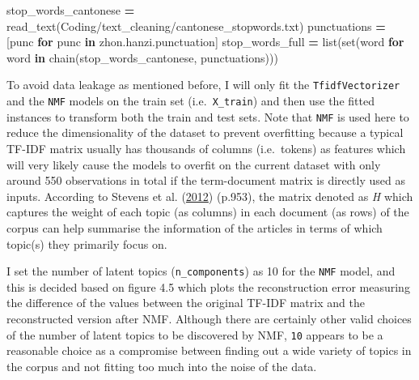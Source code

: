 \documentclass[a4paper, oneside]{report}
\newenvironment{Shaded}{\begin{snugshade}}{\end{snugshade}}
\newcommand{\BuiltInTok}[1]{#1}
\newcommand{\ControlFlowTok}[1]{\textcolor[rgb]{0.13,0.29,0.53}{\textbf{#1}}}
\newcommand{\KeywordTok}[1]{\textcolor[rgb]{0.13,0.29,0.53}{\textbf{#1}}}
\newcommand{\NormalTok}[1]{#1}
\newcommand{\OperatorTok}[1]{\textcolor[rgb]{0.81,0.36,0.00}{\textbf{#1}}}
\newcommand{\StringTok}[1]{\textcolor[rgb]{0.31,0.60,0.02}{#1}}
\renewenvironment{Shaded}
{
  \vspace{4pt}%
  \begin{snugshade}%
}{%
  \end{snugshade}%
  \vspace{4pt}%
}
\begin{document}
\begin{Shaded}
\begin{Highlighting}[]
\NormalTok{stop\_words\_cantonese }\OperatorTok{=}\NormalTok{ read\_text(}\StringTok{\textquotesingle{}Coding/text\_cleaning/cantonese\_stopwords.txt\textquotesingle{}}\NormalTok{)}
\NormalTok{punctuations }\OperatorTok{=}\NormalTok{ [punc }\ControlFlowTok{for}\NormalTok{ punc }\KeywordTok{in}\NormalTok{ zhon.hanzi.punctuation]}
\NormalTok{stop\_words\_full }\OperatorTok{=} \BuiltInTok{list}\NormalTok{(}\BuiltInTok{set}\NormalTok{(word }\ControlFlowTok{for}\NormalTok{ word }\KeywordTok{in}\NormalTok{ chain(stop\_words\_cantonese, punctuations)))  }
\end{Highlighting}
\end{Shaded}

To avoid data leakage as mentioned before, I will only fit the
\texttt{TfidfVectorizer} and the \texttt{NMF} models on the train set
(i.e.~\texttt{X\_train}) and then use the fitted instances to transform
both the train and test sets. Note that \texttt{NMF} is used here to
reduce the dimensionality of the dataset to prevent overfitting because
a typical TF-IDF matrix usually has thousands of columns (i.e.~tokens)
as features which will very likely cause the models to overfit on the
current dataset with only around 550 observations in total if the
term-document matrix is directly used as inputs. According to Stevens et
al. (\protect\hyperlink{ref-stevensExploringTopicCoherence2012}{2012})
(p.953), the matrix denoted as \emph{H} which captures the weight of
each topic (as columns) in each document (as rows) of the corpus can
help summarise the information of the articles in terms of which
topic(s) they primarily focus on.

I set the number of latent topics (\texttt{n\_components}) as 10 for the
\texttt{NMF} model, and this is decided based on figure 4.5 which plots
the reconstruction error measuring the difference of the values between
the original TF-IDF matrix and the reconstructed version after NMF.
Although there are certainly other valid choices of the number of latent
topics to be discovered by NMF, \texttt{10} appears to be a reasonable
choice as a compromise between finding out a wide variety of topics in
the corpus and not fitting too much into the noise of the data.
\end{document}
